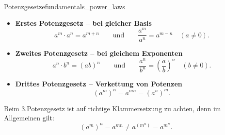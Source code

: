 \begin{TheoremBox}{Potenzgesetze}{fundamentals_power_laws}
  \begingroup
  \setlength{\abovedisplayskip}{0.45em}
  \setlength{\abovedisplayshortskip}{0.45em}
  \setlength{\belowdisplayskip}{0pt}
  \setlength{\belowdisplayshortskip}{0pt}
  \begin{itemize}[leftmargin=*,topsep=0.35em,itemsep=0.9em]
    \item \textbf{Erstes Potenzgesetz -- bei gleicher Basis}
      \[
        a^m\cdot a^n=a^{m+n}
        \qquad\text{und}\qquad
        \frac{a^m}{a^n}=a^{m-n}\quad(a\neq0).
      \]

    \item \textbf{Zweites Potenzgesetz -- bei gleichem Exponenten}
      \[
        a^n\cdot b^n=(ab)^n
        \qquad\text{und}\qquad
        \frac{a^n}{b^n}=\left(\frac ab\right)^n\quad(b\neq0).
      \]

    \item \textbf{Drittes Potenzgesetz -- Verkettung von Potenzen}
      \[
        (a^m)^n=a^{mn}=(a^n)^m.
      \]
  \end{itemize}
  \endgroup
\end{TheoremBox}

Beim 3.Potenzgesetz ist auf richtige Klammersetzung zu achten, denn im Allgemeinen gilt:
\[
  (a^m)^n=a^{mn}\neq a^{(m^n)}=a^{m^n}.
\]

